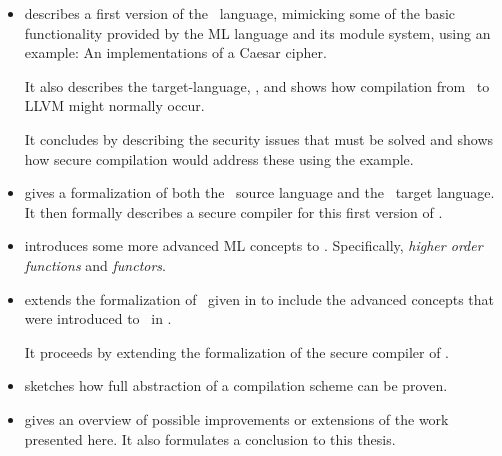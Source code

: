 \begin{itemize}
\item 
{} describes a first version of the \MiniML\ language, mimicking some of the basic functionality provided by the ML language and its module system, using an example: An implementations of a Caesar cipher.

It also describes the target-language, \LLVMIR, and shows how compilation from \MiniML\ to LLVM might normally occur.

It concludes by describing the security issues that must be solved and shows how secure compilation would address these using the example.

\item
{} gives a formalization of both the \MiniML\ source language and the \LLVMIR\ target language.
It then formally describes a secure compiler for this first version of \MiniML.

\item
{} introduces some more advanced ML concepts to \MiniML.
Specifically, \emph{higher order functions} and \emph{functors}.

\item
{} extends the formalization of \MiniML\ given in  to include the advanced concepts that were introduced to \MiniML\ in .

It proceeds by extending the formalization of the secure compiler of .

\item
{} sketches how full abstraction of a compilation scheme can be proven.

\item
{} gives an overview of possible improvements or extensions of the work presented here.
It also formulates a conclusion to this thesis.
\end{itemize}
